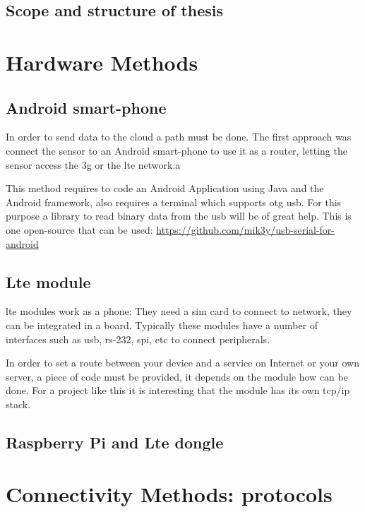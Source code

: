 \documentclass[hidelinks,11pt,a4paper,oneside,article]{memoir}
\begin{document}
\section{Scope and structure of thesis}






\chapter{Hardware Methods}
\section{Android smart-phone}
In order to send data to the cloud a path must be done. The first approach was connect the sensor to an Android smart-phone to use it as a router, letting the sensor access the \gls{3g} or the \gls{lte} network.a

This method requires to code an Android Application using Java and the Android framework, also requires a terminal which supports \gls{otg} \gls{usb}. For this purpose a library to read binary data from the \gls{usb} will be of great help. This is one open-source that can be used: \url{https://github.com/mik3y/usb-serial-for-android}

\section{Lte module}
\gls{lte} modules work as a phone: They need a \gls{sim} card to connect to network, they can be integrated in a board. Typically these modules have a number of interfaces such as \gls{usb}, rs-232, \gls{spi}, etc to connect peripherals.

In order to set a route between your device and a service on Internet or your own server, a piece of code must be provided, it depends on the module how can be done. For a project like this it is interesting that the module has its own tcp/ip stack.

\section{Raspberry Pi and Lte dongle}

\chapter{Connectivity Methods: protocols}
\end{document}
